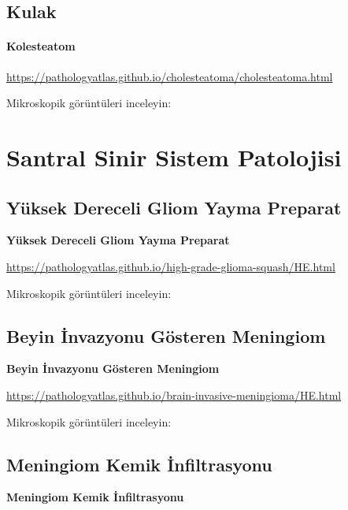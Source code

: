 \documentclass[
  letterpaper,
  DIV=11,
  numbers=noendperiod]{scrreprt}
\begin{document}
\hypertarget{kulak}{%
\chapter{Kulak}\label{kulak}}

\hypertarget{kolesteatom}{%
\subsection{Kolesteatom}\label{kolesteatom}}

\url{https://pathologyatlas.github.io/cholesteatoma/cholesteatoma.html}

Mikroskopik görüntüleri inceleyin:

\part{Santral Sinir Sistem Patolojisi}

\hypertarget{yuxfcksek-dereceli-gliom-yayma-preparat}{%
\chapter{Yüksek Dereceli Gliom Yayma
Preparat}\label{yuxfcksek-dereceli-gliom-yayma-preparat}}

\textbf{Yüksek Dereceli Gliom Yayma Preparat}

\url{https://pathologyatlas.github.io/high-grade-glioma-squash/HE.html}

Mikroskopik görüntüleri inceleyin:

\hypertarget{beyin-invazyonu-guxf6steren-meningiom}{%
\chapter{Beyin İnvazyonu Gösteren
Meningiom}\label{beyin-invazyonu-guxf6steren-meningiom}}

\textbf{Beyin İnvazyonu Gösteren Meningiom}

\url{https://pathologyatlas.github.io/brain-invasive-meningioma/HE.html}

Mikroskopik görüntüleri inceleyin:

\hypertarget{meningiom-kemik-infiltrasyonu}{%
\chapter{Meningiom Kemik
İnfiltrasyonu}\label{meningiom-kemik-infiltrasyonu}}

\textbf{Meningiom Kemik İnfiltrasyonu}
\end{document}
